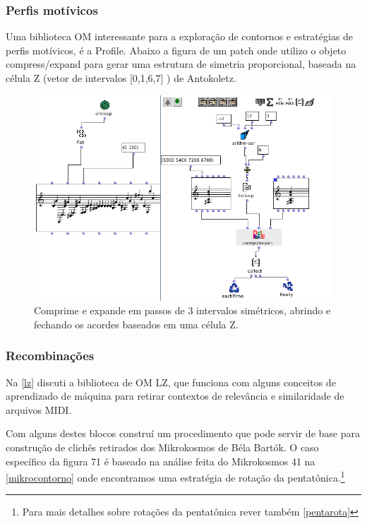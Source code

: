 \documentclass[
	12pt,				%
	openright,			%
	twoside,			%
	a4paper,			%
	english,			%
	french,				%
	spanish,			%
	brazil				%
	]{abntex2}
\begin{document}
\subsubsection{Perfis motívicos}
\label{perfis}

Uma biblioteca OM interessante para a exploração de contornos e estratégias de perfis motívicos, é a Profile. Abaixo a figura de um patch onde utilizo o objeto compress/expand para gerar uma estrutura de simetria proporcional, baseada na célula Z (vetor de intervalos [0,1,6,7] ) de Antokoletz. 

\begin{figure}[!h]
	\caption{\label{fig_grafico}Comprime e expande em passos de 3 intervalos simétricos, abrindo e fechando os acordes baseados em uma célula Z. }
	\begin{center}
	    \includegraphics[scale=0.6]{OMPD/Profile_celulaZ.png}
	\end{center}
\end{figure}


\subsubsection{Recombinações }

Na \autoref{lz} discuti a biblioteca de OM LZ, que funciona com alguns conceitos de aprendizado de máquina para retirar contextos de relevância e similaridade de arquivos MIDI.

Com alguns destes blocos construí um procedimento que pode servir de base para construção de clichês retirados dos Mikrokosmos de Béla Bartók. O caso específico da figura 71 é baseado na análise feita do Mikrokosmos 41 na \autoref{mikrocontorno} onde encontramos uma estratégia de rotação da pentatônica.\footnote{Para mais detalhes sobre rotações da pentatônica rever também \autoref{pentarota} }
\end{document}
